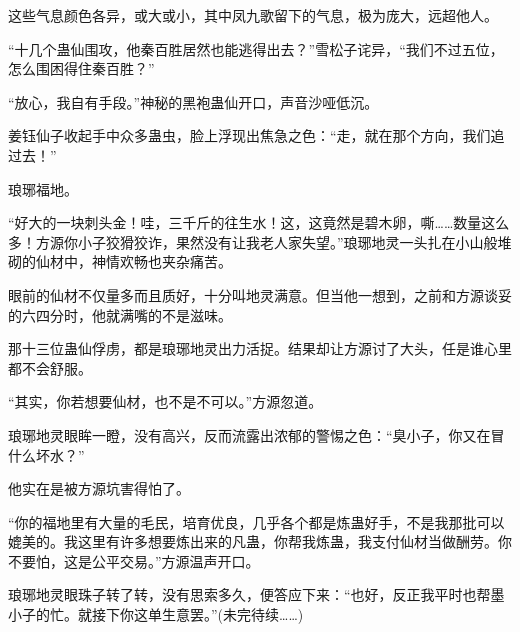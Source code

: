 \begin{this_body}
这些气息颜色各异，或大或小，其中凤九歌留下的气息，极为庞大，远超他人。

“十几个蛊仙围攻，他秦百胜居然也能逃得出去？”雪松子诧异，“我们不过五位，怎么围困得住秦百胜？”

“放心，我自有手段。”神秘的黑袍蛊仙开口，声音沙哑低沉。

姜钰仙子收起手中众多蛊虫，脸上浮现出焦急之色：“走，就在那个方向，我们追过去！”

琅琊福地。

“好大的一块刺头金！哇，三千斤的往生水！这，这竟然是碧木卵，嘶……数量这么多！方源你小子狡猾狡诈，果然没有让我老人家失望。”琅琊地灵一头扎在小山般堆砌的仙材中，神情欢畅也夹杂痛苦。

眼前的仙材不仅量多而且质好，十分叫地灵满意。但当他一想到，之前和方源谈妥的六四分时，他就满嘴的不是滋味。

那十三位蛊仙俘虏，都是琅琊地灵出力活捉。结果却让方源讨了大头，任是谁心里都不会舒服。

“其实，你若想要仙材，也不是不可以。”方源忽道。

琅琊地灵眼眸一瞪，没有高兴，反而流露出浓郁的警惕之色：“臭小子，你又在冒什么坏水？”

他实在是被方源坑害得怕了。

“你的福地里有大量的毛民，培育优良，几乎各个都是炼蛊好手，不是我那批可以媲美的。我这里有许多想要炼出来的凡蛊，你帮我炼蛊，我支付仙材当做酬劳。你不要怕，这是公平交易。”方源温声开口。

琅琊地灵眼珠子转了转，没有思索多久，便答应下来：“也好，反正我平时也帮墨小子的忙。就接下你这单生意罢。”(未完待续……)

\end{this_body}

